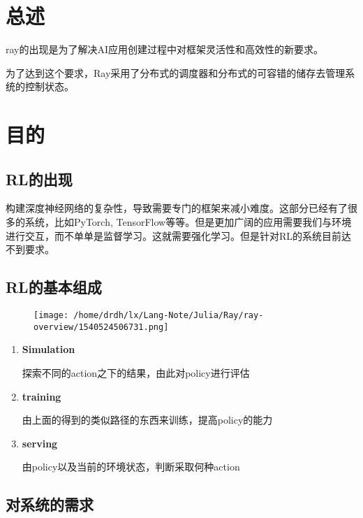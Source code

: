 \documentclass[]{article}
\date{}
\begin{document}
\section{总述}\label{header-n87}

ray的出现是为了解决AI应用创建过程中对框架灵活性和高效性的新要求。

为了达到这个要求，Ray采用了分布式的调度器和分布式的可容错的储存去管理系统的控制状态。

\section{目的}\label{header-n91}

\subsection{RL的出现}\label{header-n92}

构建深度神经网络的复杂性，导致需要专门的框架来减小难度。这部分已经有了很多的系统，比如PyTorch,
TensorFlow等等。但是更加广阔的应用需要我们与环境进行交互，而不单单是监督学习。这就需要强化学习。但是针对RL的系统目前达不到要求。

\subsection{RL的基本组成}\label{header-n94}

\begin{figure}
\centering
\texttt{[image: /home/drdh/lx/Lang-Note/Julia/Ray/ray-overview/1540524506731.png]}
\caption{}
\end{figure}

\begin{enumerate}
\def\labelenumi{\arabic{enumi}.}
\item
  \textbf{Simulation}

  探索不同的action之下的结果，由此对policy进行评估
\item
  \textbf{training}

  由上面的得到的类似路径的东西来训练，提高policy的能力
\item
  \textbf{serving}

  由policy以及当前的环境状态，判断采取何种action
\end{enumerate}

\subsection{对系统的需求}\label{header-n106}
\end{document}
